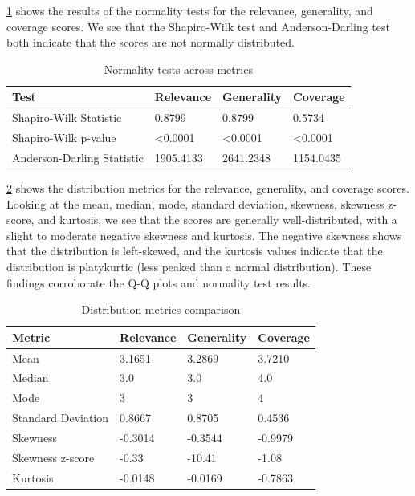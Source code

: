 \cref{tab:normality_comparison} shows the results of the normality tests for the relevance, generality, and coverage scores. We see that the Shapiro-Wilk test and Anderson-Darling test both indicate that the scores are not normally distributed.

\begin{table}[htbp]
    \centering
    \caption{Normality tests across metrics}
    \begin{tabular}{llll}
        \hline
        \textbf{Test} & \textbf{Relevance} & \textbf{Generality} & \textbf{Coverage} \\
        \hline
        Shapiro-Wilk Statistic & 0.8799 & 0.8799 & 0.5734 \\
        Shapiro-Wilk p-value & <0.0001 & <0.0001 & <0.0001 \\
        Anderson-Darling Statistic & 1905.4133 & 2641.2348 & 1154.0435 \\
        \hline
    \end{tabular}
    \label{tab:normality_comparison}
\end{table}

\cref{tab:distribution_comparison} shows the distribution metrics for the relevance, generality, and coverage scores. Looking at the mean, median, mode, standard deviation, skewness, skewness z-score, and kurtosis, we see that the scores are generally well-distributed, with a slight to moderate negative skewness and kurtosis. The negative skewness shows that the distribution is left-skewed, and the kurtosis values indicate that the distribution is platykurtic (less peaked than a normal distribution). These findings corroborate the Q-Q plots and normality test results.

\begin{table}[htbp]
    \centering
    \caption{Distribution metrics comparison}
    \begin{tabular}{llll}
        \hline
        \textbf{Metric} & \textbf{Relevance} & \textbf{Generality} & \textbf{Coverage} \\
        \hline
        Mean & 3.1651 & 3.2869 & 3.7210 \\
        Median & 3.0 & 3.0 & 4.0 \\
        Mode & 3 & 3 & 4 \\
        Standard Deviation & 0.8667 & 0.8705 & 0.4536 \\
        Skewness & -0.3014 & -0.3544 & -0.9979 \\
        Skewness z-score & -0.33 & -10.41 & -1.08 \\
        Kurtosis & -0.0148 & -0.0169 & -0.7863 \\
        \hline
    \end{tabular}
    \label{tab:distribution_comparison}
\end{table}



